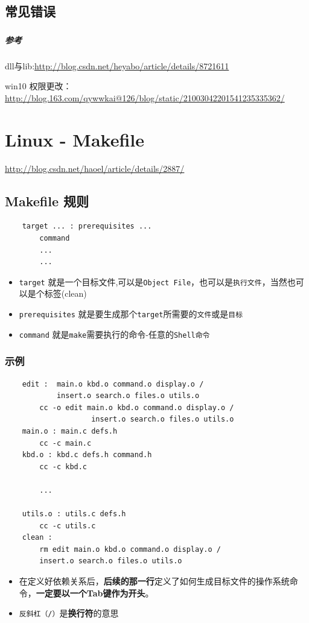 \documentclass[UTF8,a4paper,12pt]{ctexbook} %
\begin{document}
		\subsection{常见错误}
			\subsubsection{}	
			\subparagraph{参考}
			dll与lib:\url{http://blog.csdn.net/heyabo/article/details/8721611}
			
			win10 权限更改：\url{http://blog.163.com/qywwkai@126/blog/static/21003042201541235335362/}
	\section{Linux - Makefile}
	
			\url{http://blog.csdn.net/haoel/article/details/2887/}
		\subsection{Makefile 规则}
			\begin{lstlisting}
	target ... : prerequisites ...
		command
		...
		...
			\end{lstlisting}
			
			\begin{itemize}
				\item \verb|target| 就是一个目标文件,可以是\verb|Object File|，也可以是\verb|执行文件|，当然也可以是个标签(clean)
				\item \verb|prerequisites| 就是要生成那个\verb|target|所需要的\verb|文件|或是\verb|目标|
				\item \verb|command| 就是\verb|make|需要执行的命令-任意的\verb|Shell命令|
			\end{itemize}
			
			\subsubsection{示例}
				\begin{lstlisting}
	edit :  main.o kbd.o command.o display.o /
			insert.o search.o files.o utils.o
		cc -o edit main.o kbd.o command.o display.o /
					insert.o search.o files.o utils.o
	main.o : main.c defs.h
		cc -c main.c
	kbd.o : kbd.c defs.h command.h
		cc -c kbd.c
		
		...
		
	utils.o : utils.c defs.h
		cc -c utils.c
	clean :
		rm edit main.o kbd.o command.o display.o /
		insert.o search.o files.o utils.o
				\end{lstlisting}
				\begin{itemize}
					\item 在定义好依赖关系后，\textbf{后续的那一行}定义了如何生成目标文件的操作系统命令，\textbf{一定要以一个Tab键作为开头}。
					\item \verb|反斜杠（/）|是\textbf{换行符}的意思
				\end{itemize}
		
\end{document}
